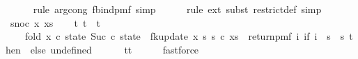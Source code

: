 \begin{isabellebody}
\ \ \ \ \isamarkupfalse%
\ {\isacharparenleft}{\kern0pt}rule\ arg{\isacharunderscore}{\kern0pt}cong{}{\isacharbrackleft}{\kern0pt}\ f{\isacharequal}{\kern0pt}{\isachardoublequoteopen}bind{\isacharunderscore}{\kern0pt}pmf{\isachardoublequoteclose}{\isacharbrackright}{\kern0pt}{\isacharcomma}{\kern0pt}\ simp{\isacharparenright}{\kern0pt}\isanewline
\ \ \ \ \isamarkupfalse%
\ {\isacharparenleft}{\kern0pt}rule\ ext{\isacharcomma}{\kern0pt}\ subst\ restrict{\isacharunderscore}{\kern0pt}def{\isacharcomma}{\kern0pt}\ simp{\isacharparenright}{\kern0pt}\isanewline
{}\isamarkupfalse%
\isanewline
\ \ \isamarkupfalse%
\ {\isacharparenleft}{\kern0pt}snoc\ x\ xs{\isacharparenright}{\kern0pt}\isanewline
\ \ \isamarkupfalse%
\ t{}\ t{}\ \ t{\isacharcolon}{\kern0pt}\isanewline
\ \ \ \ {\isachardoublequoteopen}fold\ {\isacharparenleft}{\kern0pt}{\isasymlambda}x\ {\isacharparenleft}{\kern0pt}c{\isacharcomma}{\kern0pt}\ state{\isacharparenright}{\kern0pt}{\isachardot}{\kern0pt}\ {\isacharparenleft}{\kern0pt}Suc\ c{\isacharcomma}{\kern0pt}\ state\ {\isasymbind}\ fk{\isacharunderscore}{\kern0pt}update{\isacharprime}{\kern0pt}\ x\ s\ s\ c{\isacharparenright}{\kern0pt}{\isacharparenright}{\kern0pt}\ xs\ {\isacharparenleft}{\kern0pt}{}{\isacharcomma}{\kern0pt}\ return{\isacharunderscore}{\kern0pt}pmf\ {\isacharparenleft}{\kern0pt}{\isasymlambda}i{\isachardot}{\kern0pt}\ if\ i\ {\isasymin}\ {\isacharbraceleft}{\kern0pt}{}{\isachardot}{\kern0pt}{\isachardot}{\kern0pt}{\isacharless}{\kern0pt}s\ {\isasymtimes}\ {\isacharbraceleft}{\kern0pt}{}{\isachardot}{\kern0pt}{\isachardot}{\kern0pt}{\isacharless}{\kern0pt}s\ then\ {\isacharparenleft}{\kern0pt}{}{\isacharcomma}{\kern0pt}{}{\isacharparenright}{\kern0pt}\ else\ undefined{\isacharparenright}{\kern0pt}{\isacharparenright}{\kern0pt}\ \isanewline
\ \ \ \ {\isacharequal}{\kern0pt}\ {\isacharparenleft}{\kern0pt}t{}{\isacharcomma}{\kern0pt}t{}{\isacharparenright}{\kern0pt}{\isachardoublequoteclose}\isanewline
\ \ \ \ \isamarkupfalse%
\ fastforce\isanewline
\isanewline
\ \ \isamarkupfalse%

\end{isabellebody}
